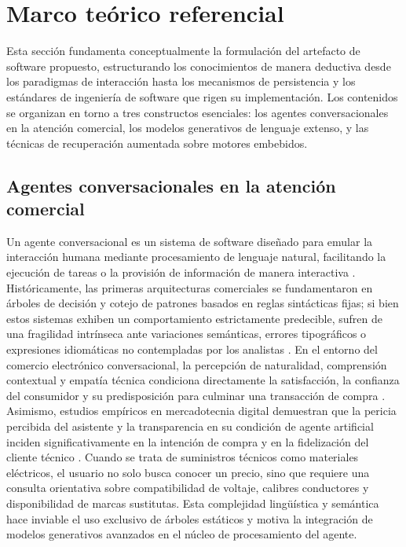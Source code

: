 \section{Marco teórico referencial}

Esta sección fundamenta conceptualmente la formulación del artefacto de software propuesto, estructurando los conocimientos de manera deductiva desde los paradigmas de interacción hasta los mecanismos de persistencia y los estándares de ingeniería de software que rigen su implementación. Los contenidos se organizan en torno a tres constructos esenciales: los agentes conversacionales en la atención comercial, los modelos generativos de lenguaje extenso, y las técnicas de recuperación aumentada sobre motores embebidos.

\subsection{Agentes conversacionales en la atención comercial}

Un agente conversacional es un sistema de software diseñado para emular la interacción humana mediante procesamiento de lenguaje natural, facilitando la ejecución de tareas o la provisión de información de manera interactiva \parencite{adamopoulou2020chatbots}. Históricamente, las primeras arquitecturas comerciales se fundamentaron en árboles de decisión y cotejo de patrones basados en reglas sintácticas fijas; si bien estos sistemas exhiben un comportamiento estrictamente predecible, sufren de una fragilidad intrínseca ante variaciones semánticas, errores tipográficos o expresiones idiomáticas no contempladas por los analistas \parencite{folstad2020users}. En el entorno del comercio electrónico conversacional, la percepción de naturalidad, comprensión contextual y empatía técnica condiciona directamente la satisfacción, la confianza del consumidor y su predisposición para culminar una transacción de compra \parencite{adam2021chatbots,ashfaq2020chatbot,sands2021who}. Asimismo, estudios empíricos en mercadotecnia digital demuestran que la pericia percibida del asistente y la transparencia en su condición de agente artificial inciden significativamente en la intención de compra y en la fidelización del cliente técnico \parencite{han2023conversational,luo2019frontiers}. Cuando se trata de suministros técnicos como materiales eléctricos, el usuario no solo busca conocer un precio, sino que requiere una consulta orientativa sobre compatibilidad de voltaje, calibres conductores y disponibilidad de marcas sustitutas. Esta complejidad lingüística y semántica hace inviable el uso exclusivo de árboles estáticos y motiva la integración de modelos generativos avanzados en el núcleo de procesamiento del agente.

